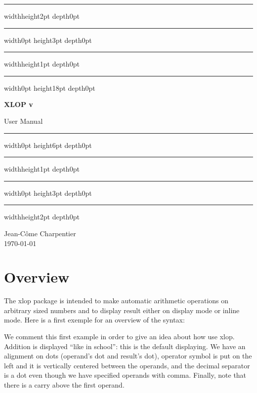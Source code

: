 \documentclass[12pt]{report}
\newcommand\package[1]{\textsf{#1}}
\begin{document}
\begin{titlepage}
  \null\par\vfill
  \begin{center}
    \begin{minipage}{0.75\linewidth}
      \hrule width\linewidth height2pt depth0pt
      \hrule width0pt height3pt depth0pt
      \hrule width\linewidth height1pt depth0pt
      \hrule width0pt height18pt depth0pt
      \begin{center}
        \Huge\bfseries XLOP v \fileversion\par\vskip18pt
        User Manual
      \end{center}
      \hrule width0pt height6pt depth0pt
      \hrule width\linewidth height1pt depth0pt
      \hrule width0pt height3pt depth0pt
      \hrule width\linewidth height2pt depth0pt
    \end{minipage}
  \end{center}
  \vfill
  \begin{center}
    Jean-Côme Charpentier\\
    \today
  \end{center}
  \vfill\null\par
\end{titlepage}
\newpage
{}
\tableofcontents
\newpage
{}

\chapter{Overview}
\label{chap:Présentation}
The \package{xlop} package is intended to make automatic arithmetic
operations on arbitrary sized numbers and to display result either on
display mode or inline mode. Here is a first exemple for an overview
of the syntax:
\begin{SideBySideExample}
\end{SideBySideExample}
We comment this first example in order to give an idea about how use
\package{xlop}.
Addition is displayed ``like in school'': this is the default
displaying. We have an alignment on dots (operand's dot and result's
dot), operator symbol is put on the left and it is vertically centered
between the operands, and the decimal separator is a dot even though we
have specified operands with comma. Finally, note that there is a
carry above the first operand.
\end{document}
